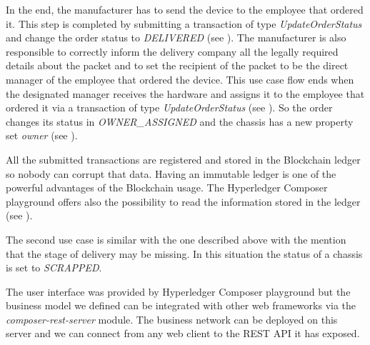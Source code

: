 
In the end, the manufacturer has to send the device to the employee that ordered it. This step is completed by submitting a transaction of type \emph{UpdateOrderStatus} and change the order status to \emph{DELIVERED} (see ). The manufacturer is also responsible to correctly inform the delivery company all the legally required details about the packet and to set the recipient of the packet to be the direct manager of the employee that ordered the device. 
This use case flow ends when the designated manager receives the hardware and assigns it to the employee that ordered it via a transaction of type \emph{UpdateOrderStatus} (see ). So the order changes its status in \emph{OWNER_ASSIGNED} and the chassis has a new property set \emph{owner} (see ).
 



All the submitted transactions are registered and stored in the Blockchain ledger so nobody can corrupt that data. Having an immutable ledger is one of the powerful advantages of the Blockchain usage. The Hyperledger Composer playground offers also the possibility to read the information stored in the ledger (see ).
\\

The second use case is similar with the one described above with the mention that the stage of delivery may be missing. In this situation the status of a chassis is set to \emph{SCRAPPED}.

The user interface was provided by Hyperledger Composer playground but the business model we defined can be integrated with other web frameworks via the \emph{composer-rest-server} module. The business network can be deployed on this server and we can connect from any web client to the REST API it has exposed.
